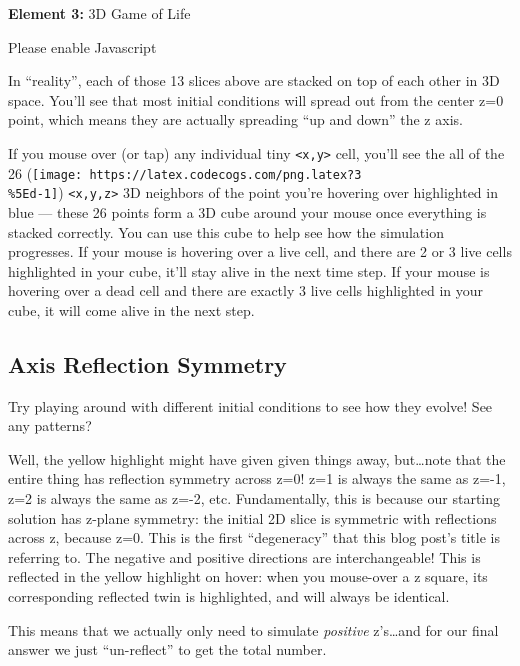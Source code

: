 \documentclass[]{article}
\begin{document}
\leavevmode\hypertarget{gol3D}{}%
\textbf{Element 3:} 3D Game of Life

\leavevmode\hypertarget{gol3DCont}{}%
Please enable Javascript

In ``reality'', each of those 13 slices above are stacked on top of each other
in 3D space. You'll see that most initial conditions will spread out from the
center z=0 point, which means they are actually spreading ``up and down'' the z
axis.

If you mouse over (or tap) any individual tiny
\texttt{\textless{}x,y\textgreater{}} cell, you'll see the all of the 26
(\texttt{[image: https://latex.codecogs.com/png.latex?3\\\%5Ed-1]})
\texttt{\textless{}x,y,z\textgreater{}} 3D neighbors of the point you're
hovering over highlighted in blue --- these 26 points form a 3D cube around your
mouse once everything is stacked correctly. You can use this cube to help see
how the simulation progresses. If your mouse is hovering over a live cell, and
there are 2 or 3 live cells highlighted in your cube, it'll stay alive in the
next time step. If your mouse is hovering over a dead cell and there are exactly
3 live cells highlighted in your cube, it will come alive in the next step.

\hypertarget{axis-reflection-symmetry}{%
\subsection{Axis Reflection Symmetry}\label{axis-reflection-symmetry}}

Try playing around with different initial conditions to see how they evolve! See
any patterns?

Well, the yellow highlight might have given given things away, but\ldots note
that the entire thing has reflection symmetry across z=0! z=1 is always the same
as z=-1, z=2 is always the same as z=-2, etc. Fundamentally, this is because our
starting solution has z-plane symmetry: the initial 2D slice is symmetric with
reflections across z, because z=0. This is the first ``degeneracy'' that this
blog post's title is referring to. The negative and positive directions are
interchangeable! This is reflected in the yellow highlight on hover: when you
mouse-over a z square, its corresponding reflected twin is highlighted, and will
always be identical.

This means that we actually only need to simulate \emph{positive} z's\ldots and
for our final answer we just ``un-reflect'' to get the total number.
\end{document}
